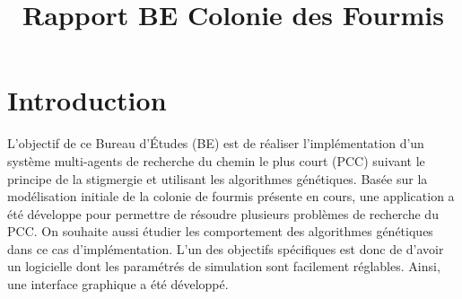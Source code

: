 \documentclass{rapportECL}
\title{Rapport BE Colonie des Fourmis} %
\begin{document}




        
\fairemarges %
\fairepagedegarde %
\tabledematieres %



\section{Introduction} 

 L'objectif de ce Bureau d'Études (BE) est de réaliser l’implémentation d’un système multi-agents de recherche du chemin le plus court (PCC) suivant le principe de la stigmergie et utilisant les algorithmes génétiques. Basée sur la modélisation initiale de la colonie de fourmis présente en cours, une application a été développe pour permettre de résoudre plusieurs problèmes de recherche du PCC. On souhaite aussi étudier les comportement des algorithmes génétiques dans ce cas d'implémentation. L'un des objectifs spécifiques est donc de d'avoir un logicielle dont les paramétrés de simulation sont facilement réglables. Ainsi, une interface graphique a été développé.



\end{document}
